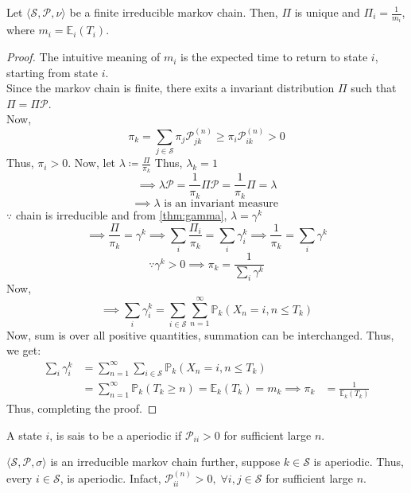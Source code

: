 \begin{theorem}
    Let \(\langle \mathcal{S} , \mathcal{P} , \nu \rangle\) be a finite irreducible markov chain. Then, \(\Pi\) is 
    unique and \(\Pi _i = \frac{1}{m_i}\), where \(m_i = \mathbb{E}_i (T_i)\).  
\end{theorem}
\begin{proof}
    The intuitive meaning of \(m_i\) is the expected time to return to state \(i\), starting from state \(i\).\\
    Since the markov chain is finite, there exits a invariant distribution \(\Pi\) such that \(\Pi = \Pi \mathcal{P} \).\\
    Now,
    \[
        \pi _k = \sum_{j \in \mathcal{S}} \pi _j \mathcal{P}_{jk}^{(n)} \geq \pi _i \mathcal{P}_{ik}^{(n)} > 0
    \]
    Thus, \(\pi _i > 0\). Now, let \(\lambda \coloneqq \frac{\Pi}{\pi _k}\) Thus, \(\lambda _k = 1\)
    \[
        \implies  \lambda \mathcal{P}  = \frac{1}{\pi _k} \Pi \mathcal{P} = \frac{1}{\pi _k} \Pi = \lambda
    \]
    \[
        \implies \lambda \text{ is an invariant measure } 
    \]
    \(\because\) chain is irreducible and from \autoref{thm:gamma}, \(\lambda = \gamma ^k\)
    \[
        \implies \frac{\Pi}{\pi_k} = \gamma ^k \implies \sum_i \frac{\Pi _i}{\pi _k} = \sum_i \gamma _i^k 
        \implies \frac{1}{\pi_k} = \sum_i \gamma ^k
    \]
    \[
        \because \gamma^k > 0 \implies \pi _k = \frac{1}{\sum\limits_i \gamma ^k}
    \]
    Now,
    \[
        \implies \sum_{i} \gamma _i^k = \sum_{i \in \mathcal{S}}\sum_{n = 1}^{\infty} \mathbb{P}_k (X_n = i, n \leq T_k)
    \]
    Now, sum is over all positive quantities, summation can be interchanged. Thus, we get:
    \[
        \begin{aligned}
            \sum_i \gamma _i^k &= \sum_{n=1}^{\infty}\sum_{i \in \mathcal{S}} \mathbb{P}_k (X_n = i, n \leq T_k)\\
            &= \sum_{n=1}^{\infty} \mathbb{P}_k (T_k \geq n) = \mathbb{E}_k (T_k) = m_k
            \implies \pi _k &= \frac{1}{\mathbb{E}_k (T_k)}
        \end{aligned}
    \]
    Thus, completing the proof.
\end{proof}
\begin{definition}
    A state \(i\), is sais to be a aperiodic if \(\mathcal{P}_{ii} > 0\) for sufficient large \(n\).  
\end{definition}
\begin{lemma}
    \(\langle \mathcal{S} , \mathcal{P} , \sigma  \rangle\) is an irreducible markov chain further, suppose 
    \(k \in \mathcal{S} \) is aperiodic. Thus, every \( i \in \mathcal{S}\), is aperiodic. Infact, 
    \(\mathcal{P}_{ii}^{(n)} > 0, \; \forall i,j \in \mathcal{S}\) for sufficient large \(n\).
\end{lemma}
